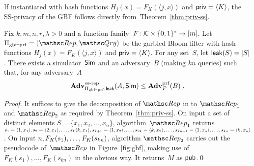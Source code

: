 If instantiated with hash functions $H_j(x) = F_K(\langle j,x \rangle)$ and ${\sf priv} = \langle K \rangle$, the SS-privacy of the GBF follows directly from~Theorem~\ref{thm:priv-ss}.
\begin{theorem}
\label{thm:gbf-prf-privacy}
Fix $k,m,n,r,\lambda>0$ and a function family~$F\colon {\cal K} \times
\{0,1\}^* \to [m]$.  Let $\setprim_{\mathrm{gbf\mbox{-}prf}}= (\Rep,
\Qry)$ be the garbled Bloom filter with hash functions
$H_j(x)=F_K(\langle j,x \rangle)$ and ${\sf priv}=\langle K \rangle$.
For any set~$S$, let ${\sf leak}(S)=|S|$.  There exists a simulator~${\sf Sim}$
and an adversary~$B$ (making $kn$ queries) such that, for any adversary~$A$
\[
\mathrm{\mathbf{Adv}}^{\mathrm{ss\mbox{-}rep}}_{\Pi_{\mathrm{gbf\mbox{-}prf}},{\sf leak}}(A,{\sf Sim}) \leq  \mathbf{Adv}^{\mathrm{prf}}_{F}(B)\;.
\]
\end{theorem}
\begin{proof}
It suffices to give the decomposition of $\Rep$ in to $\Rep_1$ and $\Rep_2$ as required by Theorem~\ref{thm:priv-ss}.
On input a set of distinct elements $S=\{x_1,x_2,\ldots,x_n\}$, algorithm~$\Rep_1$ returns $s_1=\langle 1,x_1 \rangle, s_2=\langle 2,x_1 \rangle, \ldots, s_k\langle k,x_1\rangle, s_{k+1}=\langle 1,x_2\rangle, \ldots,\linebreak s_{2k}=\langle k,x_2\rangle, \ldots ,s_{kn+1}=\langle 1,x_n\rangle, \ldots, s_{kn}=\langle k,x_n \rangle$.  On input $n,F_K(s_1),\ldots,\linebreak F_K(s_{kn})$, algorithm $\Rep_2$ carries out the pseudocode of~$\Rep$ in Figure~\ref{fig:gbf}, making use of $F_K(s_1),\ldots,F_K(s_{kn})$ in the obvious way.  It returns~$M$ as ${\sf pub}$.\hfill\qed
\end{proof}


